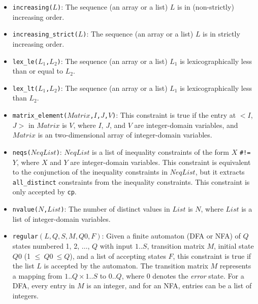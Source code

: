 \begin{itemize}
\item \texttt{increasing($L$)}: The sequence (an array or a list) $L$ is in (non-strictly) increasing order.

\item \texttt{increasing\_strict($L$)}: The sequence (an array or a list) $L$ is in strictly increasing order.

\item \texttt{lex\_le($L_1$,$L_2$)}: The sequence (an array or a list) $L_1$ is lexicographically less than or equal to $L_2$.

\item \texttt{lex\_lt($L_1$,$L_2$)}: The sequence (an array or a list) $L_1$ is lexicographically less than $L_2$.

\item \texttt{matrix\_element($Matrix$,$I$,$J$,$V$)}: This constraint is true if the entry at $<$$I$,$J$$>$ in $Matrix$ is $V$, where $I$, $J$, and $V$ are integer-domain variables, and $Matrix$ is an two-dimensional array of integer-domain variables.

\item \texttt{neqs($NeqList$)}: $NeqList$ is a list of inequality constraints of the form $X$ \verb+#!=+ $Y$, where $X$ and $Y$ are integer-domain variables. This constraint is equivalent to the conjunction of the inequality constraints in $NeqList$, but it extracts \texttt{all\_distinct} constraints from the inequality constraints. This constraint is only accepted by \texttt{cp}.

\item \texttt{nvalue($N$,$List$)}: The number of distinct values in $List$ is $N$, where $List$ is a list of integer-domain variables.

\item \texttt{regular$(L, Q, S, M, Q0, F)$}:  Given a finite automaton (DFA or NFA) of $Q$ states numbered 1, 2, $\ldots$, $Q$ with input $1..S$, transition matrix $M$, initial state $Q0$ (1 $\le\ Q0\ \le Q$), and a list of accepting states $F$, this constraint is true if the list $L$ is accepted by the automaton. The transition matrix $M$ represents a mapping from $1..Q\times 1..S$ to $0..Q$, where $0$ denotes the {\it error} state.  For a DFA, every entry in $M$ is an integer, and for an NFA, entries can be a list of integers.


\end{itemize}
